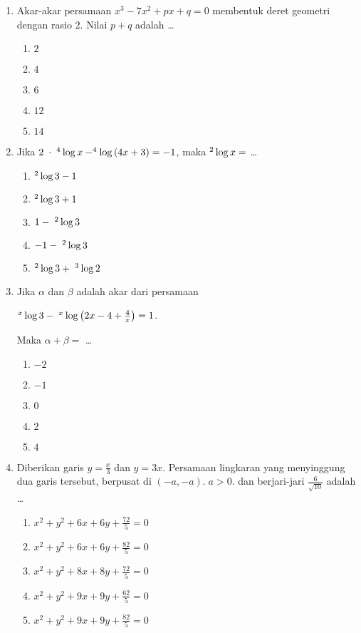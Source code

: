 \documentclass[A4,12PT, english, twocolumn]{journal}
\begin{document}
\begin{enumerate}
\item Akar-akar persamaan $x^3-7x^2+px+q=0$ membentuk deret geometri dengan rasio $2$. Nilai $p+q$ adalah \dots
    \begin{enumerate}
        \item $2$
        \item $4$
        \item $6$
        \item $12$
        \item $14$
    \end{enumerate}
    
\item Jika $2 \; \cdot \; ^4\Log x - ^4\Log {\left(4x+3 \right)} = -1$, maka $^2\Log x =$ \dots
	\begin{enumerate}
		\item $^2\Log {3} - 1$
		\item $^2\Log {3} + 1$
		\item $1 - \; ^2\Log {3}$
		\item $-1 - \; ^2\Log {3}$
		\item $^2\Log {3} + \; ^3\Log {2}$
	\end{enumerate}
	
\item Jika $\alpha$ dan $\beta$ adalah akar dari persamaan
\begin{center}
    $^x\Log{3} - \; ^x\Log{\left(2x-4+ \frac{4}{x} \right)} = 1$.
\end{center}
Maka $\alpha + \beta =$ \dots
   \begin{enumerate}
        \item $-2$
        \item $-1$
        \item $0$
        \item $2$
        \item $4$
   \end{enumerate}
   
\item Diberikan garis $y= \frac{x}{3}$ dan $y=3x$. Persamaan lingkaran yang menyinggung dua garis tersebut, berpusat di $\left(-a,-a \right). \; a>0$. dan berjari-jari $\frac{6}{\sqrt{10}}$ adalah \dots
    \begin{enumerate}
        \item $x^2+y^2+6x+6y+\frac{72}{5}=0$
        \item $x^2+y^2+6x+6y+\frac{82}{5}=0$
        \item $x^2+y^2+8x+8y+\frac{72}{5}=0$
        \item $x^2+y^2+9x+9y+\frac{62}{5}=0$
        \item $x^2+y^2+9x+9y+\frac{82}{5}=0$
    \end{enumerate}
  

\end{enumerate}
\end{document}
